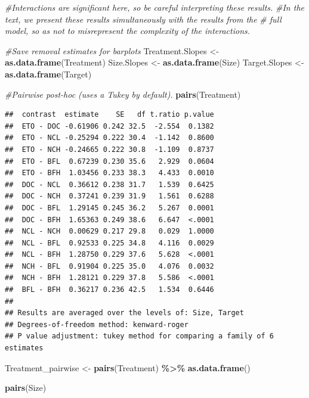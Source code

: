 \documentclass[
]{article}
\newenvironment{Shaded}{\begin{snugshade}}{\end{snugshade}}
\newcommand{\CommentTok}[1]{\textcolor[rgb]{0.56,0.35,0.01}{\textit{#1}}}
\newcommand{\FunctionTok}[1]{\textcolor[rgb]{0.13,0.29,0.53}{\textbf{#1}}}
\newcommand{\NormalTok}[1]{#1}
\newcommand{\OtherTok}[1]{\textcolor[rgb]{0.56,0.35,0.01}{#1}}
\newcommand{\SpecialCharTok}[1]{\textcolor[rgb]{0.81,0.36,0.00}{\textbf{#1}}}
\begin{document}
\begin{Shaded}
\begin{Highlighting}[]
\CommentTok{\#Interactions are significant here, so be careful interpreting these results.}
\CommentTok{\#In the text, we present these results simultaneously with the results from the}
\CommentTok{\# full model, so as not to misrepresent the complexity of the interactions. }

\CommentTok{\#Save removal estimates for barplots}
\NormalTok{Treatment.Slopes }\OtherTok{\textless{}{-}} \FunctionTok{as.data.frame}\NormalTok{(Treatment)}
\NormalTok{Size.Slopes }\OtherTok{\textless{}{-}} \FunctionTok{as.data.frame}\NormalTok{(Size)}
\NormalTok{Target.Slopes }\OtherTok{\textless{}{-}} \FunctionTok{as.data.frame}\NormalTok{(Target)}

\CommentTok{\#Pairwise post{-}hoc (uses a Tukey by default). }
\FunctionTok{pairs}\NormalTok{(Treatment)}
\end{Highlighting}
\end{Shaded}

\begin{verbatim}
##  contrast  estimate    SE   df t.ratio p.value
##  ETO - DOC -0.61906 0.242 32.5  -2.554  0.1382
##  ETO - NCL -0.25294 0.222 30.4  -1.142  0.8600
##  ETO - NCH -0.24665 0.222 30.8  -1.109  0.8737
##  ETO - BFL  0.67239 0.230 35.6   2.929  0.0604
##  ETO - BFH  1.03456 0.233 38.3   4.433  0.0010
##  DOC - NCL  0.36612 0.238 31.7   1.539  0.6425
##  DOC - NCH  0.37241 0.239 31.9   1.561  0.6288
##  DOC - BFL  1.29145 0.245 36.2   5.267  0.0001
##  DOC - BFH  1.65363 0.249 38.6   6.647  <.0001
##  NCL - NCH  0.00629 0.217 29.8   0.029  1.0000
##  NCL - BFL  0.92533 0.225 34.8   4.116  0.0029
##  NCL - BFH  1.28750 0.229 37.6   5.628  <.0001
##  NCH - BFL  0.91904 0.225 35.0   4.076  0.0032
##  NCH - BFH  1.28121 0.229 37.8   5.586  <.0001
##  BFL - BFH  0.36217 0.236 42.5   1.534  0.6446
## 
## Results are averaged over the levels of: Size, Target 
## Degrees-of-freedom method: kenward-roger 
## P value adjustment: tukey method for comparing a family of 6 estimates
\end{verbatim}

\begin{Shaded}
\begin{Highlighting}[]
\NormalTok{Treatment\_pairwise }\OtherTok{\textless{}{-}} \FunctionTok{pairs}\NormalTok{(Treatment) }\SpecialCharTok{\%\textgreater{}\%} \FunctionTok{as.data.frame}\NormalTok{()}

\FunctionTok{pairs}\NormalTok{(Size)}
\end{Highlighting}
\end{Shaded}
\end{document}
